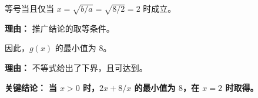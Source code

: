 \begin{examplebox}
\begin{description}[style=nextline, leftmargin=2.8em, labelsep=0.5em, itemsep=0.45em]
    \item[\textbf{第三步（取等条件）：}] 等号当且仅当 $x = \sqrt{b/a} = \sqrt{8/2} = 2$ 时成立。
    \par\textbf{理由：} 推广结论的取等条件。

    \item[\textbf{第四步（得最小值）：}] 因此，$g(x)$ 的最小值为 $8$。
    \par\textbf{理由：} 不等式给出了下界，且可达到。
\end{description}

\textbf{\textcolor{CExample}{关键结论：}} \textbf{当 $x > 0$ 时，$2x + 8/x$ 的最小值为 $8$，在 $x=2$ 时取得。}
\end{examplebox}
